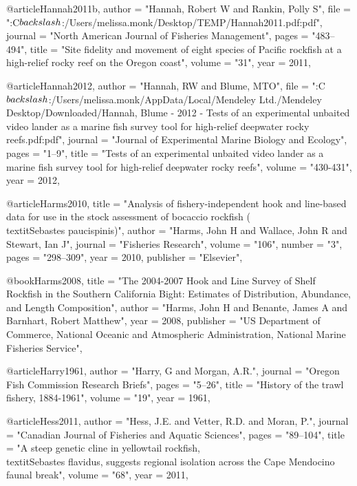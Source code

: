 @article{Hannah2011b,
    author = "{Hannah, Robert W and Rankin, Polly S}",
    file = "{:C$\\backslash$:/Users/melissa.monk/Desktop/TEMP/Hannah2011.pdf:pdf}",
    journal = "{North American Journal of Fisheries Management}",
    pages = "{483--494}",
    title = "{{Site fidelity and movement of eight species of Pacific rockfish at a high-relief rocky reef on the Oregon coast}}",
    volume = "{31}",
    year = 2011,
}

@article{Hannah2012,
    author = "{Hannah, RW and Blume, MTO}",
    file = "{:C$\\backslash$:/Users/melissa.monk/AppData/Local/Mendeley Ltd./Mendeley Desktop/Downloaded/Hannah, Blume - 2012 - Tests of an experimental unbaited video lander as a marine fish survey tool for high-relief deepwater rocky reefs.pdf:pdf}",
    journal = "{Journal of Experimental Marine Biology and Ecology}",
    pages = "{1--9}",
    title = "{{Tests of an experimental unbaited video lander as a marine fish survey tool for high-relief deepwater rocky reefs}}",
    volume = "{430-431}",
    year = 2012,
}

@article{Harms2010,
    title = "{Analysis of fishery-independent hook and line-based data for use in the stock assessment of bocaccio rockfish (\\textit{{{Sebastes}} paucispinis})}",
    author = "{Harms, John H and Wallace, John R and Stewart, Ian J}",
    journal = "{Fisheries Research}",
    volume = "{106}",
    number = "{3}",
    pages = "{298--309}",
    year = 2010,
    publisher = "{Elsevier}",
}

@book{Harms2008,
    title = "{The 2004-2007 Hook and Line Survey of Shelf Rockfish in the Southern California Bight: Estimates of Distribution, Abundance, and Length Composition}",
    author = "{Harms, John H and Benante, James A and Barnhart, Robert Matthew}",
    year = 2008,
    publisher = "{US Department of Commerce, National Oceanic and Atmospheric Administration, National Marine Fisheries Service}",
}

@article{Harry1961,
    author = "{Harry, G and Morgan, A.R.}",
    journal = "{Oregon Fish Commission Research Briefs}",
    pages = "{5--26}",
    title = "{{History of the trawl fishery, 1884-1961}}",
    volume = "{19}",
    year = 1961,
}

@article{Hess2011,
    author = "{Hess, J.E. and Vetter, R.D. and Moran, P.}",
    journal = "{Canadian Journal of Fisheries and Aquatic Sciences}",
    pages = "{89--104}",
    title = "{{A steep genetic cline in yellowtail rockfish, \\textit{{Sebastes} flavidus}, suggests regional isolation across the Cape Mendocino faunal break}}",
    volume = "{68}",
    year = 2011,
}

